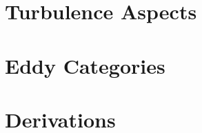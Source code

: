 
\appendix
\begin{appendices}
\begin{small}


\chapter{Turbulence Aspects}

\chapter{Eddy Categories}

\chapter{Derivations}



\end{small}
\end{appendices}
\FloatBarrier




